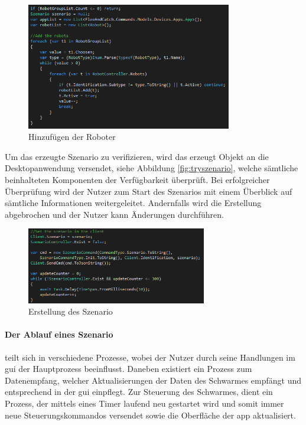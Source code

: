 \begin{figure}[h]
	\begin{center}
		\includegraphics[width=0.8\textwidth]{images/implementation/robotlist_add.png}
	\end{center}	
	\caption{Hinzufügen der Roboter}
	\label{fig:addrobots}
\end{figure}

\noindent
Um das erzeugte Szenario zu verifizieren, wird das erzeugt Objekt an die Desktopanwendung versendet, siehe Abbildung \eqref{fig:tryszenario}, welche sämtliche beinhalteten Komponenten der Verfügbarkeit überprüft. Bei erfolgreicher Überprüfung wird der Nutzer zum Start des Szenarios mit einem Überblick auf sämtliche Informationen weitergeleitet. Andernfalls wird die Erstellung abgebrochen und der Nutzer kann Änderungen durchführen.

\begin{figure}[h]
	\begin{center}
		\includegraphics[width=0.7\textwidth]{images/implementation/trycreateszenario.png}
	\end{center}	
	\caption{Erstellung des Szenario}
	\label{fig:tryszenario}
\end{figure}

\paragraph{Der Ablauf eines Szenario} teilt sich in verschiedene Prozesse, wobei der Nutzer durch seine Handlungen im \gls{gui} der Hauptprozess beeinflusst. Daneben existiert ein Prozess zum Datenempfang, welcher Aktualisierungen der Daten des Schwarmes empfängt und entsprechend in der \gls{gui} einpflegt. Zur Steuerung des Schwarmes, dient ein Prozess, der mittels eines Timer laufend neu gestartet wird und somit immer neue Steuerungskommandos versendet sowie die Oberfläche der \gls{app} aktualisiert.


